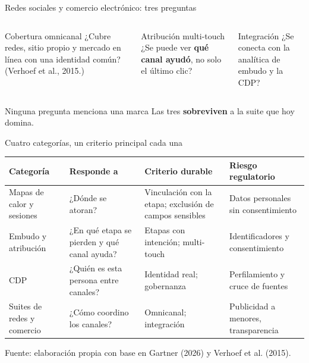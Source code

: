 \documentclass[aspectratio=169,xcolor=dvipsnames]{beamer}
\newcommand{\fuente}[1]{{\tiny\color{IPNgris}Fuente: #1}}
\begin{document}
\begin{frame}{Redes sociales y comercio electrónico: tres preguntas}
\begin{columns}[T]
  \begin{block}{Cobertura omnicanal}
    \small ¿Cubre redes, sitio propio y mercado en línea con una identidad común? (Verhoef et al., 2015.)
  \end{block}
  \begin{exampleblock}{Atribución multi-touch}
    \small ¿Se puede ver \textbf{qué canal ayudó}, no solo el último clic?
  \end{exampleblock}
  \begin{block}{Integración}
    \small ¿Se conecta con la analítica de embudo y la CDP?
  \end{block}
\end{columns}
\vspace{6pt}
\begin{alertblock}{Ninguna pregunta menciona una marca}
  \small Las tres \textbf{sobreviven} a la suite que hoy domina.
\end{alertblock}
\end{frame}

\begin{frame}{Cuatro categorías, un criterio principal cada una}
\scriptsize
\begin{center}
\begin{tabular}{@{}>{\raggedright}p{2.5cm}>{\raggedright}p{2.7cm}>{\raggedright}p{3.2cm}>{\raggedright\arraybackslash}p{2.4cm}@{}}
\toprule
\textbf{Categoría} & \textbf{Responde a} & \textbf{Criterio durable} & \textbf{Riesgo regulatorio} \\
\midrule
Mapas de calor y sesiones & ¿Dónde se atoran? & Vinculación con la etapa; exclusión de campos sensibles & Datos personales sin consentimiento \\
Embudo y atribución & ¿En qué etapa se pierden y qué canal ayuda? & Etapas con intención; multi-touch & Identificadores y consentimiento \\
CDP & ¿Quién es esta persona entre canales? & Identidad real; gobernanza & Perfilamiento y cruce de fuentes \\
Suites de redes y comercio & ¿Cómo coordino los canales? & Omnicanal; integración & Publicidad a menores, transparencia \\
\bottomrule
\end{tabular}
\end{center}
\fuente{elaboración propia con base en Gartner (2026) y Verhoef et al. (2015).}
\end{frame}
\end{document}
